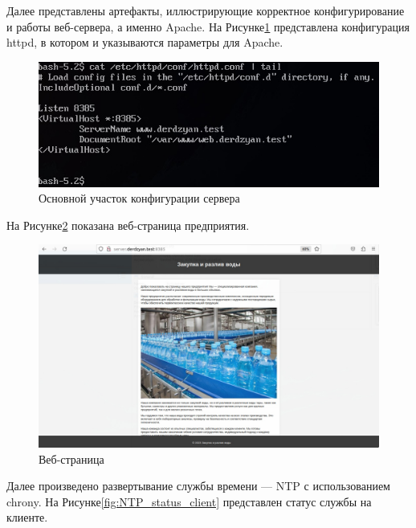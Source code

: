 Далее представлены артефакты, иллюстрирующие корректное конфигурирование и работы веб-сервера, а именно Apache. На Рисунке\;\ref{fig:apache_server_conf} представлена конфигурация httpd, в котором и указываются параметры для Apache.


\begin{figure}[H]
\centering
\includegraphics[scale=0.5]{../misc/apache_server_conf.jpg}
\caption{Основной участок конфигурации сервера\label{fig:apache_server_conf}}
\end{figure}

На Рисунке\;\ref{fig:apache_resoult} показана веб-страница предприятия.

\begin{figure}[H]
\centering
\includegraphics[scale=0.4]{../misc/apache_resoult.jpg}
\caption{Веб-страница\label{fig:apache_resoult}}
\end{figure}

Далее произведено развертывание службы времени --- NTP с использованием chrony. На Рисунке\;\ref{fig:NTP_status_client} представлен статус службы на клиенте.

